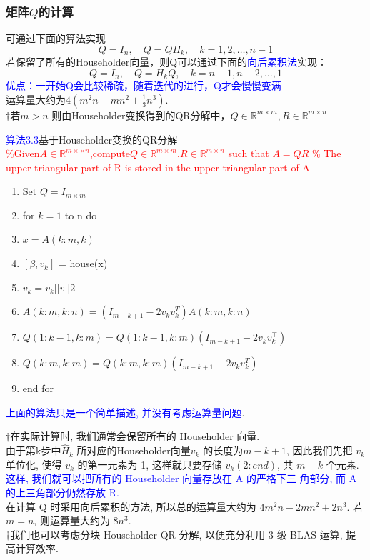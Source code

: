 \documentclass[notheorems,serif]{beamer}
\begin{document}
\begin{frame}
\frametitle{矩阵$Q$的计算}
可通过下面的算法实现
$$
Q=I_{n}, \quad Q=Q H_{k}, \quad k=1,2, \ldots, n-1
$$
若保留了所有的Householder向量，则Q可以通过下面的\textcolor{blue}{向后累积法}实现：
$$
Q=I_{n}, \quad Q=H_{k} Q, \quad k=n-1, n-2, \ldots, 1
$$
\textcolor{blue}{优点：一开始Q会比较稀疏，随着迭代的进行，Q才会慢慢变满}\\
运算量大约为$4(m^{2}n-mn^{2}+\frac{1}{3}n^{3})$.\\
$\dagger$若$m>n$ 则由Householder变换得到的QR分解中，$Q\in\mathbb{R}^{m\times m},R\in\mathbb{R}^{m\times n}$
\end{frame}

\begin{frame}
\noindent \textcolor{blue}{算法3.3}基于Householder变换的QR分解\\
\textcolor{red}{\%Given$A \in \mathbb{R}^{m×\times n}$,compute$Q \in \mathbb{R}^{m\times m}$,$R\in \mathbb{R}^{m\times n}$ such that $A = QR$ \% The upper triangular part of R is stored in the upper triangular part of A}
\begin{enumerate}[1:]
	\item Set $Q=I_{m\times m}$
	\item for $k=1$ to n do
	\item \qquad $x=A(k:m,k)$
	\item \qquad$[\beta, v_{k}]$ = house(x)
	\item \qquad$v_{k} = v_{k}||v||2$
	\item \qquad$A(k:m,k:n)=(I_{m-k+1} −2v_{k}v_{k}^{T})A(k:m,k:n)$
	\item \qquad$Q(1:k−1,k:m)=Q(1:k−1,k:m)(I_{m−k+1} -2v_{k}v_{k}^{⊺})$
	\item \qquad$Q(k:m,k:m)=Q(k:m,k:m)(I_{m−k+1} -2v_{k}v_{k}^{T})$
	\item end for
\end{enumerate}
\textcolor{blue}{上面的算法只是一个简单描述, 并没有考虑运算量问题}.
\end{frame}

\begin{frame}
$\dagger$在实际计算时, 我们通常会保留所有的 Householder 向量.\\

由于第k步中$\hat{H}_{k}$ 所对应的Householder向量$v_{k}$ 的长度为$m−k+1$, 因此我们先把 $v_{k}$ 单位化, 使得 $v_{k}$ 的第一元素为 1, 这样就只要存储 $v_{k}(2:end)$, 共 $m - k$ 个元素.\\

\textcolor{blue}{这样, 我们就可以把所有的 Householder 向量存放在 A 的严格下三 角部分, 而 A 的上三角部分仍然存放 R.}\\

在计算 Q 时采用向后累积的方法, 所以总的运算量大约为 $4m^{2}n - 2mn^{2} + 2n^{3}$. 若 $m = n$, 则运算量大约为 $8n^{3}$.\\

$\dagger$我们也可以考虑分块 Householder QR 分解, 以便充分利用 3 级 BLAS 运算, 提高计算效率.
\end{frame}
\end{document}
